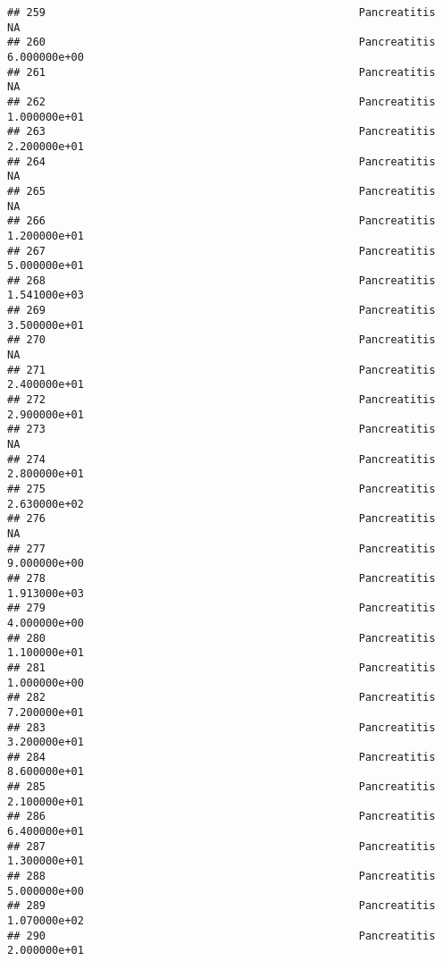 \documentclass[
]{article}
\begin{document}
\begin{verbatim}
## 259                                                 Pancreatitis            NA
## 260                                                 Pancreatitis  6.000000e+00
## 261                                                 Pancreatitis            NA
## 262                                                 Pancreatitis  1.000000e+01
## 263                                                 Pancreatitis  2.200000e+01
## 264                                                 Pancreatitis            NA
## 265                                                 Pancreatitis            NA
## 266                                                 Pancreatitis  1.200000e+01
## 267                                                 Pancreatitis  5.000000e+01
## 268                                                 Pancreatitis  1.541000e+03
## 269                                                 Pancreatitis  3.500000e+01
## 270                                                 Pancreatitis            NA
## 271                                                 Pancreatitis  2.400000e+01
## 272                                                 Pancreatitis  2.900000e+01
## 273                                                 Pancreatitis            NA
## 274                                                 Pancreatitis  2.800000e+01
## 275                                                 Pancreatitis  2.630000e+02
## 276                                                 Pancreatitis            NA
## 277                                                 Pancreatitis  9.000000e+00
## 278                                                 Pancreatitis  1.913000e+03
## 279                                                 Pancreatitis  4.000000e+00
## 280                                                 Pancreatitis  1.100000e+01
## 281                                                 Pancreatitis  1.000000e+00
## 282                                                 Pancreatitis  7.200000e+01
## 283                                                 Pancreatitis  3.200000e+01
## 284                                                 Pancreatitis  8.600000e+01
## 285                                                 Pancreatitis  2.100000e+01
## 286                                                 Pancreatitis  6.400000e+01
## 287                                                 Pancreatitis  1.300000e+01
## 288                                                 Pancreatitis  5.000000e+00
## 289                                                 Pancreatitis  1.070000e+02
## 290                                                 Pancreatitis  2.000000e+01

\end{verbatim}
\end{document}
